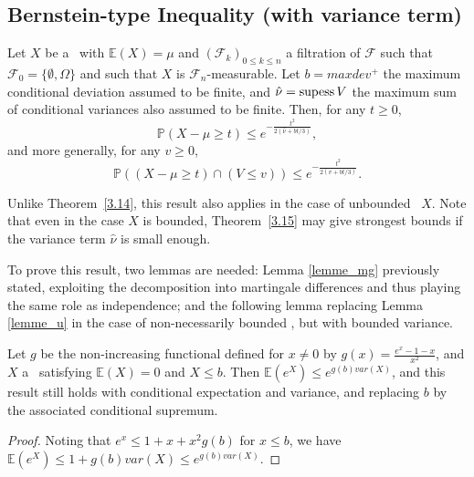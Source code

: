 \subsection{Bernstein-type Inequality (with variance term)}
\label{sec:concentration-contrib}
\begin{theorem}
\label{3.15}
Let $X$ be a \rv~with $\mathbb{E}(X)=\mu$ and $(\mathcal{F}_k)_{0\leq k \leq n}$ a filtration of $\mathcal{F}$ such that $ \mathcal{F}_0 =  \{\emptyset , \Omega\} $ and such that $X$ is $\mathcal{F}_n$-measurable.
Let $b=maxdev^+$ the maximum conditional deviation assumed to be finite, and $\hat\nu=\supess V$ the maximum sum of conditional variances also assumed to be finite.
Then, for any  $t \geq 0$, $$\mathbb{P}(X-\mu \geq t) \leq e^{-\frac{t^2}{2(\hat\nu+bt/3)}},$$
and more generally, for any $v \geq 0$,~ $$\mathbb{P}((X-\mu \geq t)\cap(V \leq v)) \leq e^{-\frac{t^2}{2(v+bt/3)}}.$$
\end{theorem}

Unlike Theorem~\ref{3.14}, this result also applies in the case of unbounded \rv~$X$. Note that even in the case $X$ is bounded, Theorem~\ref{3.15} may give strongest bounds if the variance term $\hat\nu$ is small enough. 

To prove this result, two lemmas are needed: Lemma \ref{lemme_mg} previously stated, exploiting the decomposition into martingale differences and thus playing the same role as independence; and the following lemma replacing Lemma \ref{lemme_u} in the case of non-necessarily bounded \rv, but with bounded variance.
\begin{lemma}
\label{lemme_u2}
Let $g$ be the non-increasing functional defined for $x \neq 0$ by $g(x)=\frac{e^x-1-x}{x^2}$, and $X$ a \rv~satisfying $\mathbb{E}(X)=0$ and $X \leq b$.
Then $\mathbb{E}(e^X) \leq e^{g(b)var(X)}$, and this result still holds with conditional expectation and variance, and replacing $b$ by the associated conditional supremum.%
\end{lemma}
\begin{proof}
Noting that $e^x \leq 1+x+x^2g(b)$ for $x \leq b$, we have $\mathbb{E}(e^X) \le 1 + g(b) var(X) \le e^{g(b) var(X)}$.
\end{proof}

